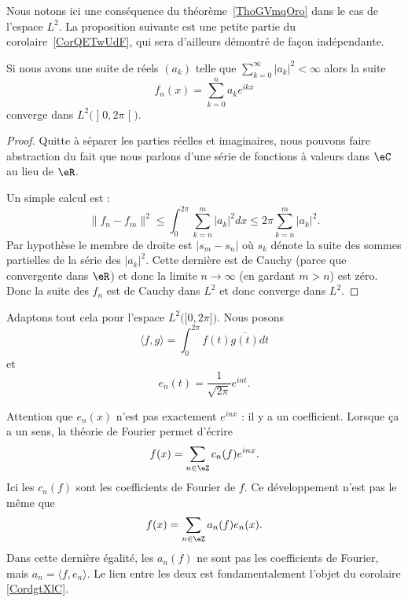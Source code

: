 	Nous notons ici une conséquence du théorème~\ref{ThoGVmqOro} dans le cas de l'espace \( L^2\). La proposition suivante est une petite partie du corolaire~\ref{CorQETwUdF}, qui sera d'ailleurs démontré de façon indépendante.

	\begin{proposition}
		Si nous avons une suite de réels \( (a_k)\) telle que \( \sum_{k=0}^{\infty}| a_k |^2<\infty\) alors la suite
		\begin{equation}
			f_n(x)=\sum_{k=0}^na_k e^{ikx}
		\end{equation}
		converge dans \( L^2\big( \mathopen] 0 , 2\pi \mathclose[ \big)\).
	\end{proposition}

	\begin{proof}
		Quitte à séparer les parties réelles et imaginaires, nous pouvons faire abstraction du fait que nous parlons d'une série de fonctions à valeurs dans \( \eC\) au lieu de \( \eR\).

		Un simple calcul est :
		\begin{equation}    \label{EqHVdJxZT}
			\| f_n-f_m \|^2\leq\int_0^{2\pi}\sum_{k=n}^m| a_k |^2dx\leq 2\pi\sum_{k=n}^m| a_k |^2.
		\end{equation}
		Par hypothèse le membre de droite est \( | s_m-s_n |\) où \( s_k\) dénote la suite des sommes partielles de la série des \( | a_k |^2\). Cette dernière est de Cauchy (parce que convergente dans \( \eR\)) et donc la limite \( n\to\infty\) (en gardant \( m>n\)) est zéro. Donc la suite des \( f_n\) est de Cauchy dans \( L^2\) et donc converge dans \( L^2\).
	\end{proof}

	\begin{normaltext}
		Adaptons tout cela pour l'espace \( L^2\big( \mathopen[ 0 , 2\pi \mathclose] \big)\). Nous posons
		\begin{equation}        \label{EQooBFKDooMkCZOt}
			\langle f, g\rangle =\int_0^{2\pi}f(t)\overline{ g(t) }dt
		\end{equation}
		et
		\begin{equation}        \label{EQooKMYOooLZCNap}
			e_n(t)=\frac{1}{ \sqrt{ 2\pi } } e^{int}.
		\end{equation}
	\end{normaltext}

	\begin{normaltext}
		Attention que \( e_n(x)\) n'est pas exactement \(  e^{inx}\) : il y a un coefficient. Lorsque ça a un sens, la théorie de Fourier permet d'écrire
		\begin{equation}
			f(x)=\sum_{n\in \eZ}c_n(f) e^{inx}.
		\end{equation}
		Ici les \( c_n(f)\) sont les coefficients de Fourier de \( f\). Ce développement n'est pas le même que
		\begin{equation}
			f(x)=\sum_{n\in \eZ}a_n(f)e_n(x).
		\end{equation}
		Dans cette dernière égalité, les \( a_n(f)\) ne sont pas les coefficients de Fourier, mais \( a_n=\langle f, e_n\rangle \). Le lien entre les deux est fondamentalement l'objet du corolaire \ref{CordgtXlC}.
	\end{normaltext}


